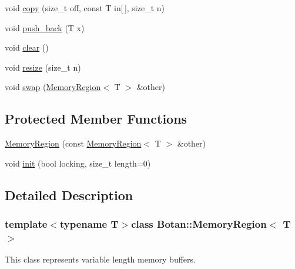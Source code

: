 \begin{DoxyCompactItemize}
void \hyperlink{classBotan_1_1MemoryRegion_a93b09b57c2cea8922d68dde0a2a52ab2}{copy} (size\-\_\-t off, const T in\mbox{[}$\,$\mbox{]}, size\-\_\-t n)
\item 
void \hyperlink{classBotan_1_1MemoryRegion_a2ccfc6fb4e0d27f8df2bf48df1748ed4}{push\-\_\-back} (T x)
\item 
void \hyperlink{classBotan_1_1MemoryRegion_aa13ffeda96e22a2bebcb37e58bbd5cf7}{clear} ()
\item 
void \hyperlink{classBotan_1_1MemoryRegion_ab1e2ade57b73e9d77137544692fd5865}{resize} (size\-\_\-t n)
\item 
void \hyperlink{classBotan_1_1MemoryRegion_ab2d40c9ce4a5dcc3f01a5b243850fabc}{swap} (\hyperlink{classBotan_1_1MemoryRegion}{Memory\-Region}$<$ T $>$ \&other)
\end{DoxyCompactItemize}
\subsection*{Protected Member Functions}
\begin{DoxyCompactItemize}
\item 
\hyperlink{classBotan_1_1MemoryRegion_ab89d833d829aa9fb4d7ad86f0ea6ca7d}{Memory\-Region} (const \hyperlink{classBotan_1_1MemoryRegion}{Memory\-Region}$<$ T $>$ \&other)
\item 
void \hyperlink{classBotan_1_1MemoryRegion_a906d866c0c69a3dfc493eb0e2bf2207c}{init} (bool locking, size\-\_\-t length=0)
\end{DoxyCompactItemize}


\subsection{Detailed Description}
\subsubsection*{template$<$typename T$>$class Botan\-::\-Memory\-Region$<$ T $>$}

This class represents variable length memory buffers. 

